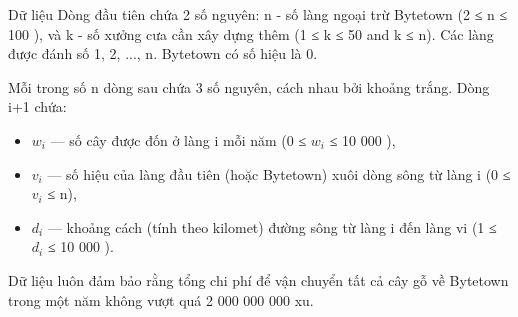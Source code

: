 Dữ liệu
Dòng đầu tiên chứa 2 số nguyên: n - số làng ngoại trừ Bytetown (2 ≤ n ≤ 100 ), và k - số xưởng cưa cần xây dựng thêm (1 ≤ k ≤ 50 and k ≤ n). Các làng được đánh số 1, 2, ..., n. Bytetown có số hiệu là 0.  

   Mỗi trong số n dòng sau chứa 3 số nguyên, cách nhau bởi khoảng trắng. Dòng i+1 chứa:  
\begin{itemize}
	\item     $w_{i}$    — số cây được đốn ở làng i mỗi năm (0 ≤ $w_{i}$    ≤ 10 000 ),   
	\item     $v_{i}$    — số hiệu của làng đầu tiên (hoặc Bytetown) xuôi dòng sông từ làng i (0 ≤ $v_{i}$    ≤ n),   
	\item     $d_{i}$    — khoảng cách (tính theo kilomet) đường sông từ làng i đến làng vi (1 ≤ $d_{i}$    ≤ 10 000 ).   
\end{itemize}

   Dữ liệu luôn đảm bảo rằng tổng chi phí để vận chuyển tất cả cây gỗ về Bytetown trong một năm không vượt quá 2 000 000 000 xu.